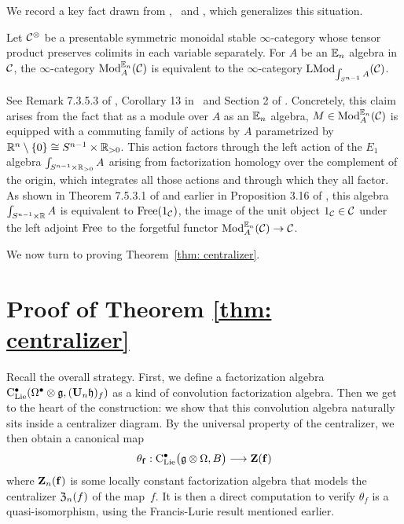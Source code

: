 \documentclass[11pt]{amsart}
\numberwithin{equation}{section}
\begin{document}
We record a key fact drawn from \cite{LurieHA},~\cite{FrancisHH}  and \cite{GG-Notes}, which generalizes this situation.

\begin{prp}
\label{P:ModentoModSn}
Let $\mathcal C^\otimes$ be a presentable symmetric monoidal stable $\infty$-category whose tensor product preserves colimits in each variable separately.
For $A$ be an $\mathbb E_n$ algebra in $\mathcal C$,
the $\infty$-category ${\rm Mod}^{\mathbb E_n}_A(\mathcal C)$ is equivalent to the $\infty$-category ${\rm LMod}_{{\int_{S^{n-1}} A}}(\mathcal C)$.
\end{prp}

See Remark 7.3.5.3 of \cite{LurieHA}, Corollary 13 in~\cite{GG-Notes} and Section 2 of \cite{FrancisHH}.
Concretely, this claim arises from the fact that as a module over $A$ as an $\mathbb E_n$ algebra, 
$M \in {\rm Mod}^{\mathbb E_n}_A(\mathcal C)$ is equipped with a commuting family of actions by $A$ parametrized by $\mathbb R^n \setminus \{0\}\cong S^{n-1} \times \mathbb R_{>0}$.
This action factors through the left action of the $E_1$ algebra $\int_{S^{n-1} \times \mathbb R_{>0}} A$ arising from factorization homology over the complement of the origin,
which integrates all those actions and through which they all factor. 
As shown in Theorem 7.5.3.1 of \cite{LurieHA} and earlier in Proposition 3.16 of \cite{FrancisHH}, 
this algebra $\int_{S^{n-1} \times \mathbb R} A$ is equivalent to ${\rm Free}(1_\mathcal C)$, 
the image of the unit object $1_\mathcal C \in \mathcal C$ under the left adjoint ${\rm Free}$ to the forgetful functor ${\rm Mod}^{\mathbb E_n}_A(\mathcal C) \to \mathcal C$.

We now turn to proving Theorem~\ref{thm: centralizer}.

\section{Proof of Theorem \ref{thm: centralizer}}

Recall the overall strategy.
First, we define a factorization algebra ${\rm C}_{\rm Lie}^\bullet(\Omega^\bullet \otimes \mathfrak g, (\mathbf U_n \mathfrak h)_f)$ as a kind of convolution factorization algebra.
Then we get to the heart of the construction:
we show that this convolution algebra naturally sits inside a centralizer diagram.
By the universal property of the centralizer, we then obtain 
a canonical map 
\[
\theta_{{\bf f}}: {\rm C}_{\rm Lie}^\bullet\big(\mathfrak g\otimes \Omega , B \big) \longrightarrow  \mathbf Z(\mathbf{f})
\]
where $\mathbf Z_n(\mathbf{f})$ is some locally constant factorization algebra that models the centralizer ${\frak Z}_n(f)$ of the map~$f$.
It is then a direct computation to verify $\theta_f$ is a quasi-isomorphism,
using the Francis-Lurie result mentioned earlier.
\end{document}
